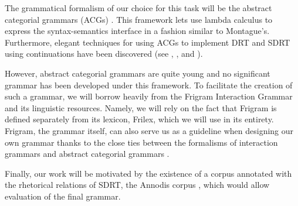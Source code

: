 The grammatical formalism of our choice for this task will be the
abstract categorial grammars (ACGs) \cite{de2001towards}. This framework
lets use lambda calculus to express the syntax-semantics interface in a
fashion similar to Montague's. Furthermore, elegant techniques for using
ACGs to implement DRT and SDRT using continuations have been discovered
(see \cite{de2006towards}, \cite{asher2011sdrt},
\cite{asher2011montagovian} and \cite{qian2011event}).

However, abstract categorial grammars are quite young and no significant
grammar has been developed under this framework. To facilitate the
creation of such a grammar, we will borrow heavily from the Frigram
Interaction Grammar \cite{perrier2007french} and its linguistic
resources. Namely, we will rely on the fact that Frigram is defined
separately from its lexicon, Frilex, which we will use in its
entirety. Frigram, the grammar itself, can also serve us as a guideline
when designing our own grammar thanks to the close ties between the
formalisms of interaction grammars and abstract categorial grammars
\cite{perrier1999intuitionistic}.

Finally, our work will be motivated by the existence of a corpus
annotated with the rhetorical relations of SDRT, the Annodis corpus
\cite{afantenos2012empirical}, which would allow evaluation of the final
grammar.
